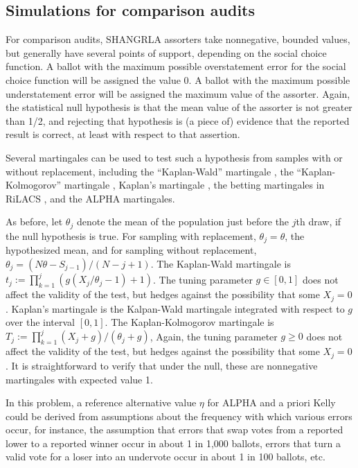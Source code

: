 \documentclass[12pt,runningheads]{llncs}
\begin{document}
{\subsection{Simulations for comparison audits} \label{sec:comparison-audits}

For comparison audits, SHANGRLA assorters take nonnegative, bounded values, but generally have  several points of 
support, depending on the social choice function.
A ballot with the maximum possible overstatement error for the social choice function will be assigned the value 0.
A ballot with the maximum possible understatement error will be assigned the maximum value of the assorter.
Again, the statistical null hypothesis is that the mean value of the assorter is not greater than 1/2, and rejecting that
hypothesis is (a piece of) evidence that the reported result is correct, at least with respect to that assertion.

Several martingales can be used to test such a hypothesis from samples with or without replacement, including the 
``Kaplan-Wald'' martingale \cite{stark09b}, the ``Kaplan-Kolmogorov'' martingale \cite{starkEvans19,stark20}, Kaplan's martingale 
\cite{starkEvans19,stark20},
the betting martingales in RiLACS \cite{waudby-smithEtal21}, and the ALPHA martingales.

As before, let $\theta_j$ denote the mean of the population just before the $j$th draw, if the null hypothesis is true.
For sampling with replacement, $\theta_j = \theta$, the hypothesized mean, and for sampling without replacement,
$\theta_j = (N\theta-S_{j-1})/(N-j+1)$.
The Kaplan-Wald martingale is $t_j := \prod_{k=1}^j \left (g(X_j/\theta_j - 1)+1 \right )$.
The tuning parameter $g \in [0, 1]$ does not affect the validity of the test, but hedges against the possibility that some $X_j = 0$.
Kaplan's martingale is the Kalpan-Wald martingale integrated with respect to $g$ over the interval $[0, 1]$.
The Kaplan-Kolmogorov martingale is $T_j := \prod_{k=1}^j (X_j+g)/(\theta_j+g)$, 
Again, the tuning parameter $g \ge 0$ does not affect the validity of the test, but hedges against the possibility that some $X_j = 0$.
It is straightforward to verify that under the null, these are nonnegative martingales with expected value 1.

In this problem, a reference alternative value $\eta$ for ALPHA and a priori Kelly could be derived from assumptions about the 
frequency with which
various errors occur, for instance, the assumption that errors that swap votes from a reported lower to a reported winner occur
in about 1 in 1,000 ballots, errors that turn a valid vote for a loser into an undervote occur in about 1 in 100 ballots, etc.

}
\end{document}
